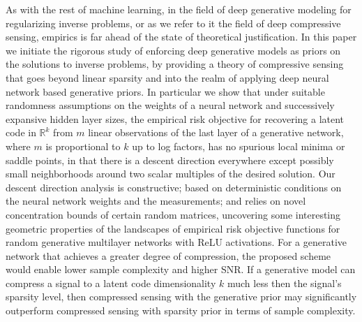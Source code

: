 \documentclass[11pt]{article}
\begin{document}
As with the rest of machine learning, in the field of deep generative modeling for regularizing inverse problems, or as we refer to it the field of deep compressive sensing, empirics is far ahead of the state of theoretical justification. In this paper we initiate the rigorous study of enforcing deep generative models as priors on the solutions to inverse problems, by providing a theory of compressive sensing that goes beyond linear sparsity and into the realm of applying deep neural network based generative priors. In particular we show that under suitable randomness assumptions on the weights of a neural network and successively expansive hidden layer sizes, the empirical risk objective for recovering a latent code in $\mathbb{R}^k$ from $m$ linear observations of the last layer of a generative network, where $m$ is proportional to $k$ up to log factors, has no spurious local minima or saddle points, in that there is a descent direction everywhere except possibly small neighborhoods around two scalar multiples of the desired solution.  Our descent direction analysis is constructive; based on deterministic conditions on the neural network weights and the measurements; and relies on novel concentration bounds of certain random matrices, uncovering some interesting geometric properties of the landscapes of empirical risk objective functions for random generative multilayer networks with ReLU activations. For a generative network that achieves a greater degree of compression, the proposed scheme would enable lower sample complexity and higher SNR.  If a generative model can compress a signal to a latent code dimensionality $k$ much less then the signal's sparsity level, then compressed sensing with the generative prior may significantly outperform compressed sensing with sparsity prior in terms of sample complexity.
 

\end{document}
